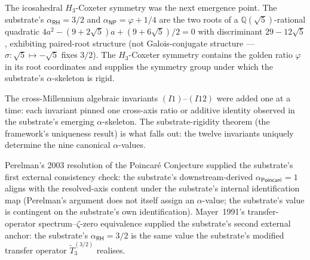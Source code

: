 \documentclass[11pt,a4paper]{amsart}
\theoremstyle{plain}
\theoremstyle{definition}
\begin{document}
The icosahedral $H_3$-Coxeter symmetry was the next emergence point. The substrate's $\alpha_{\textsf{RH}} = 3/2$ and $\alpha_{\textsf{NP}} = \varphi + 1/4$ are the two roots of a $\mathbb{Q}(\sqrt{5})$-rational quadratic $4a^2 - (9+2\sqrt{5})a + (9+6\sqrt{5})/2 = 0$ with discriminant $29-12\sqrt{5}$, exhibiting paired-root structure (not Galois-conjugate structure --- $\sigma:\sqrt{5}\mapsto-\sqrt{5}$ fixes $3/2$). The $H_3$-Coxeter symmetry contains the golden ratio $\varphi$ in its root coordinates and supplies the symmetry group under which the substrate's $\alpha$-skeleton is rigid.

The cross-Millennium algebraic invariants $(I1)$--$(I12)$ were added one at a time: each invariant pinned one cross-axis ratio or additive identity observed in the substrate's emerging $\alpha$-skeleton. The substrate-rigidity theorem (the framework's uniqueness result) is what falls out: the twelve invariants uniquely determine the nine canonical $\alpha$-values.

Perelman's 2003 resolution of the Poincar\'e Conjecture supplied the substrate's first external consistency check: the substrate's downstream-derived $\alpha_{\textsf{Poincar\'e}}=1$ aligns with the resolved-axis content under the substrate's internal identification map (Perelman's argument does not itself assign an $\alpha$-value; the substrate's value is contingent on the substrate's own identification). Mayer~1991's transfer-operator spectrum--$\zeta$-zero equivalence supplied the substrate's second external anchor: the substrate's $\alpha_{\textsf{RH}}=3/2$ is the same value the substrate's modified transfer operator $\widetilde{T}_3^{(3/2)}$ realises.
\end{document}
